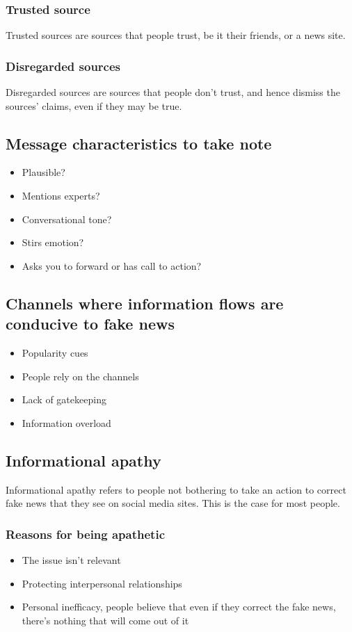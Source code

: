 \documentclass[11pt]{article}
\begin{document}
\subsubsection{Trusted source}
\label{sec:orgbef50fc}
Trusted sources are sources that people trust, be it their friends, or a news site.

\subsubsection{Disregarded sources}
\label{sec:org4a256da}
Disregarded sources are sources that people don't trust, and hence dismiss the sources' claims, even if they may be true.

 \newpage

\subsection{Message characteristics to take note}
\label{sec:org8c5cf7e}
\begin{itemize}
\item Plausible?
\item Mentions experts?
\item Conversational tone?
\item Stirs emotion?
\item Asks you to forward or has call to action?
\end{itemize}

\subsection{Channels where information flows are conducive to fake news}
\label{sec:org385e137}
\begin{itemize}
\item Popularity cues
\item People rely on the channels
\item Lack of gatekeeping
\item Information overload
\end{itemize}

\subsection{Informational apathy}
\label{sec:orga8830aa}
Informational apathy refers to people not bothering to take an action to correct fake news that they see on social media sites. This is the case for most people.

\subsubsection{Reasons for being apathetic}
\label{sec:org0b7d9aa}
\begin{itemize}
\item The issue isn't relevant
\item Protecting interpersonal relationships
\item Personal inefficacy, people believe that even if they correct the fake news, there's nothing that will come out of it
\end{itemize}
\end{document}
